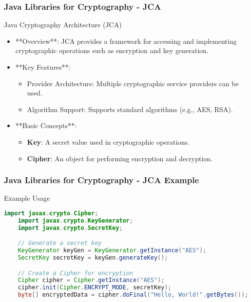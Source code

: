\documentclass{beamer}
\begin{document}
\begin{frame}[fragile]
    \frametitle{Java Libraries for Cryptography - JCA}
    \begin{block}{Java Cryptography Architecture (JCA)}
        \begin{itemize}
            \item **Overview**: JCA provides a framework for accessing and implementing cryptographic operations such as encryption and key generation.
            \item **Key Features**:
                \begin{itemize}
                    \item Provider Architecture: Multiple cryptographic service providers can be used.
                    \item Algorithm Support: Supports standard algorithms (e.g., AES, RSA).
                \end{itemize}
            \item **Basic Concepts**:
                \begin{itemize}
                    \item \textbf{Key}: A secret value used in cryptographic operations.
                    \item \textbf{Cipher}: An object for performing encryption and decryption.
                \end{itemize}
        \end{itemize}
    \end{block}
\end{frame}

\begin{frame}[fragile]
    \frametitle{Java Libraries for Cryptography - JCA Example}
    \begin{block}{Example Usage}
    \begin{lstlisting}[language=Java]
    import javax.crypto.Cipher;
    import javax.crypto.KeyGenerator;
    import javax.crypto.SecretKey;

    // Generate a secret key
    KeyGenerator keyGen = KeyGenerator.getInstance("AES");
    SecretKey secretKey = keyGen.generateKey();

    // Create a Cipher for encryption
    Cipher cipher = Cipher.getInstance("AES");
    cipher.init(Cipher.ENCRYPT_MODE, secretKey);
    byte[] encryptedData = cipher.doFinal("Hello, World!".getBytes());
    \end{lstlisting}
    \end{block}
\end{frame}
\end{document}
